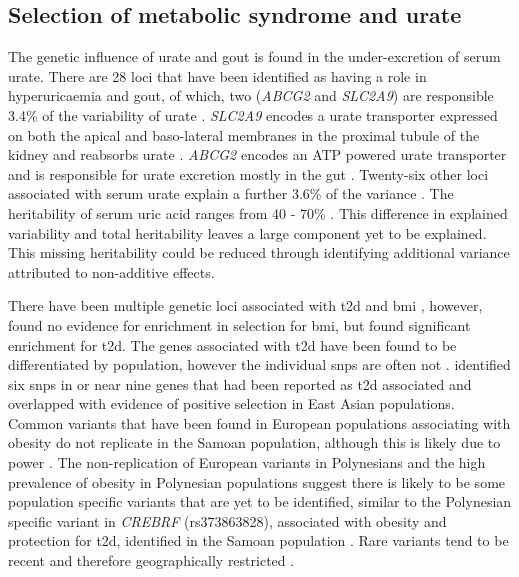 \documentclass[twoside,openright]{report}
\begin{document}
\subsection{Selection of metabolic syndrome and urate}\label{goutMetSyn}

The genetic influence of urate and gout is found in the under-excretion
of serum urate. There are 28 loci that have been identified as having a
role in hyperuricaemia and gout, of which, two (\emph{ABCG2} and
\emph{SLC2A9}) are responsible 3.4\% of the variability of urate
\citep{Kottgen2013}. \emph{SLC2A9} encodes a urate transporter expressed
on both the apical and baso-lateral membranes in the proximal tubule of
the kidney and reabsorbs urate \citep{Mandal2015}. \emph{ABCG2} encodes
an ATP powered urate transporter and is responsible for urate excretion
mostly in the gut \citep{Maliepaard2001, Mandal2015}. Twenty-six other
loci associated with serum urate explain a further 3.6\% of the variance
\citep{Kottgen2013}. The heritability of serum uric acid ranges from 40
- 70\% \citep{Yang2005, Nath2007}. This difference in explained
variability and total heritability leaves a large component yet to be
explained. This missing heritability could be reduced through
identifying additional variance attributed to non-additive effects.

There have been multiple genetic loci associated with \gls{t2d}
\citep{Billings2010} and \gls{bmi} \citep{Locke2015}, however,
\citet{Chen2010} found no evidence for enrichment in selection for
\gls{bmi}, but found significant enrichment for \gls{t2d}. The genes
associated with \gls{t2d} have been found to be differentiated by
population, however the individual \glspl{snp} are often not
\citep{pickrell2009signals}. \citet{Koh2014} identified six \glspl{snp}
in or near nine genes that had been reported as \gls{t2d} associated and
overlapped with evidence of positive selection in East Asian
populations. Common variants that have been found in European
populations associating with obesity do not replicate in the Samoan
population, although this is likely due to power \citep{Karns2012}. The
non-replication of European variants in Polynesians and the high
prevalence of obesity in Polynesian populations suggest there is likely
to be some population specific variants that are yet to be identified,
similar to the Polynesian specific variant in \emph{CREBRF}
(rs373863828), associated with obesity and protection for \gls{t2d},
identified in the Samoan population \citep{Minster2016}. Rare variants
tend to be recent and therefore geographically restricted
\citep{1KGP2012}.
\end{document}
